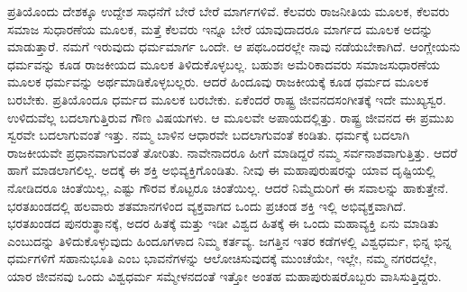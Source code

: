 ಪ್ರತಿಯೊಂದು ದೇಶಕ್ಕೂ ಉದ್ದೇಶ ಸಾಧನೆಗೆ ಬೇರೆ ಬೇರೆ ಮಾರ್ಗಗಳಿವೆ. ಕೆಲವರು ರಾಜನೀತಿಯ ಮೂಲಕ, ಕೆಲವರು ಸಮಾಜ ಸುಧಾರಣೆಯ ಮೂಲಕ, ಮತ್ತೆ ಕೆಲವರು ಇನ್ನೂ ಬೇರೆ ಯಾವುದಾದರೂ ಮಾರ್ಗದ ಮೂಲಕ ಅದನ್ನು ಮಾಡುತ್ತಾರೆ. ನಮಗೆ ಇರುವುದು ಧರ್ಮಮಾರ್ಗ ಒಂದೇ. ಆ ಪಥ\break ಒಂದರಲ್ಲೇ ನಾವು ನಡೆಯಬೇಕಾಗಿದೆ. ಆಂಗ್ಲೇಯನು ಧರ್ಮವನ್ನು ಕೂಡ ರಾಜಕೀಯದ ಮೂಲಕ ತಿಳಿದುಕೊಳ್ಳಬಲ್ಲ. ಬಹುಶಃ ಅಮೆರಿಕಾದವರು ಸಮಾಜಸುಧಾರಣೆಯ ಮೂಲಕ ಧರ್ಮವನ್ನು ಅರ್ಥಮಾಡಿಕೊಳ್ಳಬಲ್ಲರು. ಆದರೆ ಹಿಂದೂವು ರಾಜಕೀಯಕ್ಕೆ ಕೂಡ ಧರ್ಮದ ಮೂಲಕ ಬರಬೇಕು. ಪ್ರತಿಯೊಂದೂ ಧರ್ಮದ ಮೂಲಕ ಬರಬೇಕು. ಏಕೆಂದರೆ ರಾಷ್ಟ್ರ ಜೀವನದ\break ಸಂಗೀತಕ್ಕೆ ಇದೇ ಮುಖ್ಯಸ್ವರ. ಉಳಿದುವೆಲ್ಲ ಬದಲಾಗುತ್ತಿರುವ ಗೌಣ ವಿಷಯಗಳು. ಆ ಮೂಲವೇ ಅಪಾಯದಲ್ಲಿತ್ತು. ರಾಷ್ಟ್ರ ಜೀವನದ ಈ ಪ್ರಮುಖ ಸ್ವರವೇ ಬದಲಾಗುವಂತೆ ಇತ್ತು. ನಮ್ಮ ಬಾಳಿನ ಆಧಾರವೇ ಬದಲಾಗುವಂತೆ ಕಂಡಿತು. ಧರ್ಮಕ್ಕೆ ಬದಲಾಗಿ ರಾಜಕೀಯವೇ ಪ್ರಧಾನವಾಗುವಂತೆ ತೋರಿತು. ನಾವೇನಾದರೂ ಹೀಗೆ ಮಾಡಿದ್ದರೆ ನಮ್ಮ ಸರ್ವನಾಶವಾಗುತ್ತಿತ್ತು. ಆದರೆ ಹಾಗೆ ಮಾಡಲಾಗಲಿಲ್ಲ. ಅದಕ್ಕೆ ಈ ಶಕ್ತಿ ಅಭಿವ್ಯಕ್ತಿಗೊಂಡಿತು. ನೀವು ಈ ಮಹಾಪುರುಷರನ್ನು ಯಾವ ದೃಷ್ಟಿಯಲ್ಲಿ ನೋಡಿದರೂ ಚಿಂತೆಯಿಲ್ಲ, ಎಷ್ಟು ಗೌರವ ಕೊಟ್ಟರೂ ಚಿಂತೆಯಿಲ್ಲ. ಆದರೆ ನಿಮ್ಮೆದುರಿಗೆ ಈ ಸವಾಲನ್ನು ಹಾಕುತ್ತೇನೆ. ಭರತಖಂಡದಲ್ಲಿ ಹಲವಾರು ಶತಮಾನಗಳಿಂದ ವ್ಯಕ್ತವಾಗದ ಒಂದು ಪ್ರಚಂಡ ಶಕ್ತಿ ಇಲ್ಲಿ ಅಭಿವ್ಯಕ್ತವಾಗಿದೆ. ಭರತಖಂಡದ ಪುನರುತ್ಥಾನಕ್ಕೆ, ಅದರ ಹಿತಕ್ಕೆ ಮತ್ತು ಇಡೀ ವಿಶ್ವದ ಹಿತಕ್ಕೆ ಈ ಒಂದು ಮಹಾವ್ಯಕ್ತಿ ಏನು ಮಾಡಿತು ಎಂಬುದನ್ನು ತಿಳಿದುಕೊಳ್ಳುವುದು ಹಿಂದೂಗಳಾದ ನಿಮ್ಮ ಕರ್ತವ್ಯ. ಜಗತ್ತಿನ ಇತರ ಕಡೆಗಳಲ್ಲಿ ವಿಶ್ವಧರ್ಮ, ಭಿನ್ನ ಭಿನ್ನ ಧರ್ಮಗಳಿಗೆ ಸಹಾನುಭೂತಿ ಎಂಬ ಭಾವನೆಗಳನ್ನು ಆಲೋಚಿಸುವುದಕ್ಕೆ ಮುಂಚೆಯೇ, ಇಲ್ಲೇ, ನಮ್ಮ ನಗರದಲ್ಲೇ, ಯಾರ ಜೀವನವು ಒಂದು ವಿಶ್ವಧರ್ಮ ಸಮ್ಮೇಳನದಂತೆ ಇತ್ತೋ ಅಂತಹ ಮಹಾಪುರುಷರೊಬ್ಬರು ವಾಸಿಸುತ್ತಿದ್ದರು.

